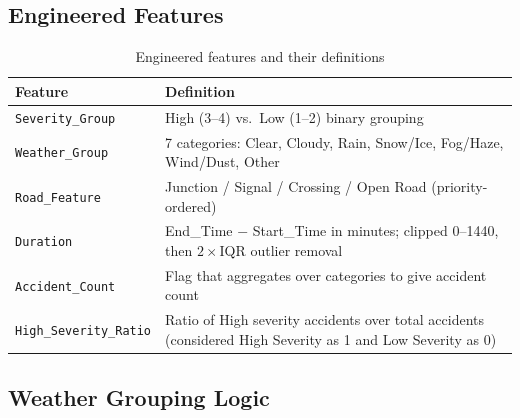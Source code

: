 \vspace{-10pt}

\subsection{Engineered Features}
\begin{table}[!htbp]
\centering\small
\begin{tabularx}{\linewidth}{@{} l X @{}}
  \toprule
  \textbf{Feature} & \textbf{Definition} \\ \midrule

  \texttt{Severity\_Group}
    & High (3--4) vs.\ Low (1--2) binary grouping \\

  \texttt{Weather\_Group}
    & 7 categories: Clear, Cloudy, Rain, Snow/Ice,
      Fog/Haze, Wind/Dust, Other \\

  \texttt{Road\_Feature}
    & Junction / Signal / Crossing / Open Road (priority-ordered) \\

  \texttt{Duration}
    & End\_Time $-$ Start\_Time in minutes; clipped 0--1440, then
      $2\times$IQR outlier removal \\

  \texttt{Accident\_Count}
    & Flag that aggregates over categories to give accident count \\

  \texttt{High\_Severity\_Ratio}
    & Ratio of High severity accidents over total accidents (considered High Severity as 1 and Low Severity as 0) \\

  \bottomrule
\end{tabularx}
\caption{Engineered features and their definitions}
\end{table}
\vspace{-10pt}
\subsection{Weather Grouping Logic}

